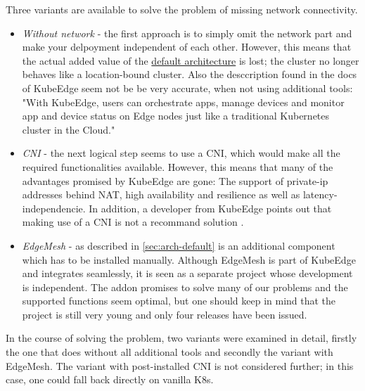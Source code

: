 \documentclass[MSC,Master,english]{twbook}%
\begin{document}
Three variants are available to solve the problem of missing network connectivity.
\begin{itemize}
    \item \textit{Without network} - the first approach is to simply omit the network part and make your delpoyment independent of each other. However, this means that the actual added value of the \hyperref[sec:arch-default]{default architecture} is lost; the cluster no longer behaves like a location-bound cluster. Also the desccription found in the docs of KubeEdge seem not be be very accurate, when not using additional tools: "With KubeEdge, users can orchestrate apps, manage devices and monitor app and device status on Edge nodes just like a traditional Kubernetes cluster in the Cloud." \cite{ke-docs-why}
    \item \textit{CNI} - the next logical step seems to use a \ac{CNI}, which would make all the required functionalities available. However, this means that many of the advantages promised by KubeEdge are gone: The support of private-ip addresses behind \ac{NAT}, high availability and resilience as well as latency-independencie. In addition, a developer from KubeEdge points out that making use of a \ac{CNI} is not a recommand solution \cite{ke-cni-no}.
    \item \textit{EdgeMesh} - as described in \autoref{sec:arch-default} is an additional component which has to be installed manually. Although EdgeMesh is part of KubeEdge and integrates seamlessly, it is seen as a separate project whose development is independent. The addon promises to solve many of our problems and the supported functions seem optimal, but one should keep in mind that the project is still very young and only four releases have been issued.
\end{itemize}
In the course of solving the problem, two variants were examined in detail, firstly the one that does without all additional tools and secondly the variant with EdgeMesh. The variant with post-installed CNI is not considered further; in this case, one could fall back directly on vanilla \ac{K8s}.
\end{document}
